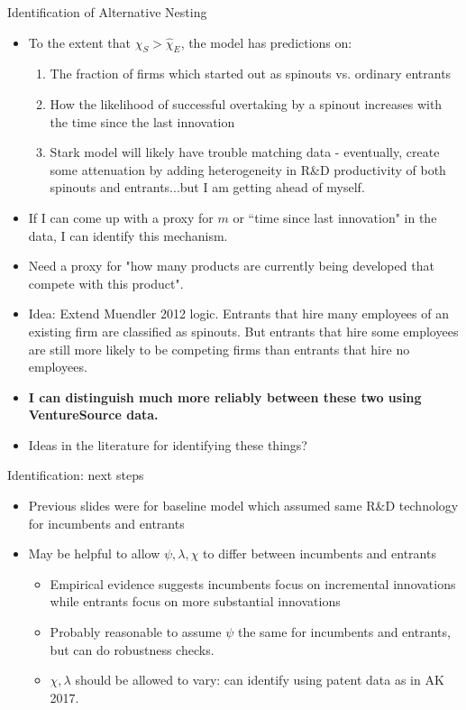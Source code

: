 \documentclass[english,usenames,dvipsnames]{beamer}
\begin{document}
\begin{frame}{Identification of Alternative Nesting}
\begin{itemize}
	\small
	\item To the extent that $\hat{\chi}_S > \hat{\chi}_E$, the model has predictions on:
	\begin{enumerate}
		\item The fraction of firms which started out as spinouts vs. ordinary entrants
		\item How the likelihood of successful overtaking by a spinout increases with the time since the last innovation 
		\item Stark model will likely have trouble matching data - eventually, create some attenuation by adding heterogeneity in R\&D productivity of both spinouts and entrants...but I am getting ahead of myself.
	\end{enumerate}
	\item If I can come up with a proxy for $m$ or ``time since last innovation" in the data, I can identify this mechanism.  
	\item Need a proxy for "how many products are currently being developed that compete with this product". 
	\item Idea: Extend Muendler 2012 logic. Entrants that hire many employees of an existing firm are classified as spinouts. But entrants that hire some employees are still more likely to be competing firms than entrants that hire no employees. 
	\item \textbf{I can distinguish much more reliably between these two using VentureSource data. }
	\item Ideas in the literature for identifying these things? 
\end{itemize}
\end{frame}

\begin{frame}{Identification: next steps}
\begin{itemize}
	\item Previous slides were for baseline model which assumed same R\&D technology for incumbents and entrants
	\item May be helpful to allow $\psi,\lambda,\chi$ to differ between incumbents and entrants
	\begin{itemize}
		\item Empirical evidence suggests incumbents focus on incremental innovations while entrants focus on more substantial innovations
		\item Probably reasonable to assume $\psi$ the same for incumbents and entrants, but can do robustness checks.
		\item $\chi,\lambda$ should be allowed to vary: can identify using patent data as in AK 2017. 
	\end{itemize}
\end{itemize}
\end{frame}
\end{document}
